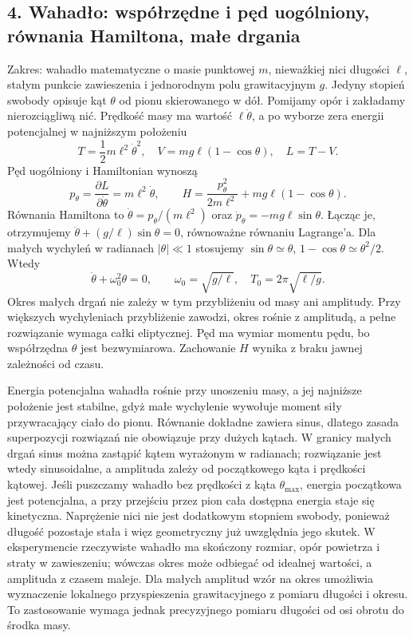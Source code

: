\documentclass[11pt,a4paper]{article}
\begin{document}
\subsection{4. Wahadło: współrzędne i pęd uogólniony, równania Hamiltona, małe drgania}
Zakres: wahadło matematyczne o masie punktowej \(m\), nieważkiej nici długości \(\ell\), stałym punkcie zawieszenia i jednorodnym polu grawitacyjnym \(g\). Jedyny stopień swobody opisuje kąt \(\theta\) od pionu skierowanego w dół. Pomijamy opór i zakładamy nierozciągliwą nić. Prędkość masy ma wartość \(\ell\dot\theta\), a po wyborze zera energii potencjalnej w najniższym położeniu
\[
T=\frac12m\ell^2\dot\theta^2,\quad
V=mg\ell(1-\cos\theta),\quad L=T-V.
\]
Pęd uogólniony i Hamiltonian wynoszą
\[
p_\theta=\frac{\partial L}{\partial\dot\theta}=m\ell^2\dot\theta,\qquad
H=\frac{p_\theta^2}{2m\ell^2}+mg\ell(1-\cos\theta).
\]
Równania Hamiltona to \(\dot\theta=p_\theta/(m\ell^2)\) oraz \(\dot p_\theta=-mg\ell\sin\theta\). Łącząc je, otrzymujemy \(\ddot\theta+(g/\ell)\sin\theta=0\), równoważne równaniu Lagrange’a. Dla małych wychyleń w radianach \(|\theta|\ll1\) stosujemy \(\sin\theta\simeq\theta\), \(1-\cos\theta\simeq\theta^2/2\). Wtedy
\[
\ddot\theta+\omega_0^2\theta=0,\qquad \omega_0=\sqrt{g/\ell},\quad
T_0=2\pi\sqrt{\ell/g}.
\]
Okres małych drgań nie zależy w tym przybliżeniu od masy ani amplitudy. Przy większych wychyleniach przybliżenie zawodzi, okres rośnie z amplitudą, a pełne rozwiązanie wymaga całki eliptycznej. Pęd ma wymiar momentu pędu, bo współrzędna \(\theta\) jest bezwymiarowa. Zachowanie \(H\) wynika z braku jawnej zależności od czasu.

Energia potencjalna wahadła rośnie przy unoszeniu masy, a jej najniższe położenie jest stabilne, gdyż małe wychylenie wywołuje moment siły przywracający ciało do pionu. Równanie dokładne zawiera sinus, dlatego zasada superpozycji rozwiązań nie obowiązuje przy dużych kątach. W granicy małych drgań sinus można zastąpić kątem wyrażonym w radianach; rozwiązanie jest wtedy sinusoidalne, a amplituda zależy od początkowego kąta i prędkości kątowej. Jeśli puszczamy wahadło bez prędkości z kąta \(\theta_{\max}\), energia początkowa jest potencjalna, a przy przejściu przez pion cała dostępna energia staje się kinetyczna. Naprężenie nici nie jest dodatkowym stopniem swobody, ponieważ długość pozostaje stała i więz geometryczny już uwzględnia jego skutek. W eksperymencie rzeczywiste wahadło ma skończony rozmiar, opór powietrza i straty w zawieszeniu; wówczas okres może odbiegać od idealnej wartości, a amplituda z czasem maleje. Dla małych amplitud wzór na okres umożliwia wyznaczenie lokalnego przyspieszenia grawitacyjnego z pomiaru długości i okresu. To zastosowanie wymaga jednak precyzyjnego pomiaru długości od osi obrotu do środka masy.
\end{document}

